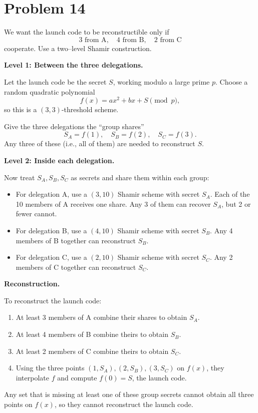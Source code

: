 \section*{Problem 14}

We want the launch code to be reconstructible only if
\[
3 \text{ from A},\quad 4 \text{ from B},\quad 2 \text{ from C}
\]
cooperate. Use a two–level Shamir construction.

\medskip
\noindent\textbf{Level 1: Between the three delegations.}

Let the launch code be the secret \(S\), working modulo a large prime \(p\).
Choose a random quadratic polynomial
\[
f(x)=ax^{2}+bx+S \pmod{p},
\]
so this is a \((3,3)\)-threshold scheme.

Give the three delegations the ``group shares''
\[
S_A=f(1),\quad S_B=f(2),\quad S_C=f(3).
\]
Any three of these (i.e., all of them) are needed to reconstruct \(S\).

\medskip
\noindent\textbf{Level 2: Inside each delegation.}

Now treat \(S_A,S_B,S_C\) as secrets and share them within each group:

\begin{itemize}
  \item For delegation A, use a \((3,10)\) Shamir scheme with secret \(S_A\).
        Each of the 10 members of A receives one share. Any 3 of them can
        recover \(S_A\), but 2 or fewer cannot.

  \item For delegation B, use a \((4,10)\) Shamir scheme with secret \(S_B\).
        Any 4 members of B together can reconstruct \(S_B\).

  \item For delegation C, use a \((2,10)\) Shamir scheme with secret \(S_C\).
        Any 2 members of C together can reconstruct \(S_C\).
\end{itemize}

\medskip
\noindent\textbf{Reconstruction.}

To reconstruct the launch code:

\begin{enumerate}
  \item At least 3 members of A combine their shares to obtain \(S_A\).
  \item At least 4 members of B combine theirs to obtain \(S_B\).
  \item At least 2 members of C combine theirs to obtain \(S_C\).
  \item Using the three points \((1,S_A),(2,S_B),(3,S_C)\) on \(f(x)\),
        they interpolate \(f\) and compute \(f(0)=S\), the launch code.
\end{enumerate}

Any set that is missing at least one of these group secrets cannot obtain all three
points on \(f(x)\), so they cannot reconstruct the launch code.
